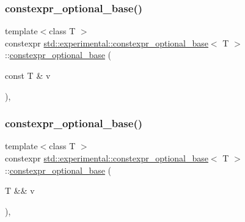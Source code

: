 \subsubsection{\texorpdfstring{constexpr\+\_\+optional\+\_\+base()}{constexpr\_optional\_base()}\hspace{0.1cm}{\footnotesize\ttfamily [2/5]}}
{\footnotesize\ttfamily template$<$class T $>$ \\
constexpr \mbox{\hyperlink{structstd_1_1experimental_1_1constexpr__optional__base}{std\+::experimental\+::constexpr\+\_\+optional\+\_\+base}}$<$ T $>$\+::\mbox{\hyperlink{structstd_1_1experimental_1_1constexpr__optional__base}{constexpr\+\_\+optional\+\_\+base}} (\begin{DoxyParamCaption}\item[{const T \&}]{v }\end{DoxyParamCaption})\hspace{0.3cm}{\ttfamily [inline]}, {\ttfamily [explicit]}}

\mbox{\label{structstd_1_1experimental_1_1constexpr__optional__base_a7a1c2735a3d7c86bdd4e179f9e291444}} 
\subsubsection{\texorpdfstring{constexpr\+\_\+optional\+\_\+base()}{constexpr\_optional\_base()}\hspace{0.1cm}{\footnotesize\ttfamily [3/5]}}
{\footnotesize\ttfamily template$<$class T $>$ \\
constexpr \mbox{\hyperlink{structstd_1_1experimental_1_1constexpr__optional__base}{std\+::experimental\+::constexpr\+\_\+optional\+\_\+base}}$<$ T $>$\+::\mbox{\hyperlink{structstd_1_1experimental_1_1constexpr__optional__base}{constexpr\+\_\+optional\+\_\+base}} (\begin{DoxyParamCaption}\item[{T \&\&}]{v }\end{DoxyParamCaption})\hspace{0.3cm}{\ttfamily [inline]}, {\ttfamily [explicit]}}

